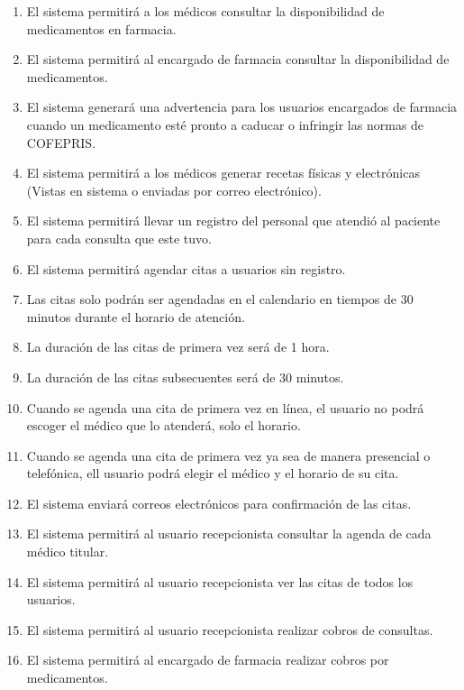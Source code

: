 \documentclass[12pt,letterpaper]{article}
\begin{document}
{{{\begin{itemize}
\begin{enumerate}
                        \item El sistema permitirá a los médicos consultar la disponibilidad de medicamentos en farmacia.
                        \item El sistema permitirá al encargado de farmacia consultar la disponibilidad de medicamentos.
                        \item El sistema generará una advertencia para los usuarios encargados de farmacia cuando un medicamento esté pronto a caducar o infringir las normas de COFEPRIS.
                        \item El sistema permitirá a los médicos generar recetas físicas y electrónicas (Vistas en sistema o enviadas por correo electrónico).
                        \item El sistema permitirá llevar un registro del personal que atendió al paciente para cada consulta que este tuvo.
                        \item El sistema permitirá agendar citas a usuarios sin registro.
                        \item Las citas solo podrán ser agendadas en el calendario en tiempos de 30 minutos durante el horario de atención.
                        \item La duración de las citas de primera vez será de 1 hora.
                        \item La duración de las citas  subsecuentes será de 30 minutos.
                        \item Cuando se agenda una cita de primera vez en línea, el usuario no podrá escoger el médico que lo atenderá, solo el horario.
                        \item Cuando se agenda una cita de primera vez ya sea de manera presencial o telefónica, ell usuario podrá elegir el médico y el horario de su cita.
                        \item El sistema enviará correos electrónicos para confirmación de las citas.
                        \item El sistema permitirá al usuario recepcionista consultar la agenda de cada médico titular.
                        \item El sistema permitirá al usuario recepcionista ver las citas de todos los usuarios.
                        \item El sistema permitirá al usuario recepcionista realizar cobros de consultas.
                        \item El sistema permitirá al encargado de farmacia realizar cobros por medicamentos.

\end{enumerate}
\end{itemize}}}}
\end{document}
